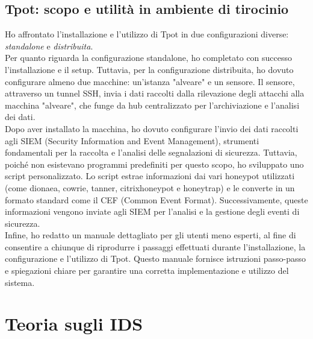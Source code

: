 \documentclass[12pt,a4paper,oneside,onecolumn,openright]{book}
\begin{document}
	\subsection{Tpot: scopo e utilità in ambiente di tirocinio}
	Ho affrontato l'installazione e l'utilizzo di Tpot in due configurazioni diverse: \textit{standalone} e \textit{distribuita}.\\
	Per quanto riguarda la configurazione standalone, ho completato con successo l'installazione e il setup. Tuttavia, per la configurazione distribuita, ho dovuto configurare almeno due macchine: un'istanza "alveare" e un sensore. Il sensore, attraverso un tunnel SSH, invia i dati raccolti dalla rilevazione degli attacchi alla macchina "alveare", che funge da hub centralizzato per l'archiviazione e l'analisi dei dati.\\
	Dopo aver installato la macchina, ho dovuto configurare l'invio dei dati raccolti agli SIEM (Security Information and Event Management), strumenti fondamentali per la raccolta e l'analisi delle segnalazioni di sicurezza. Tuttavia, poiché non esistevano programmi predefiniti per questo scopo, ho sviluppato uno script personalizzato. Lo script estrae informazioni dai vari honeypot utilizzati (come dionaea, cowrie, tanner, citrixhoneypot e honeytrap) e le converte in un formato standard come il CEF (Common Event Format). Successivamente, queste informazioni vengono inviate agli SIEM per l'analisi e la gestione degli eventi di sicurezza.\\
	Infine, ho redatto un manuale dettagliato per gli utenti meno esperti, al fine di consentire a chiunque di riprodurre i passaggi effettuati durante l'installazione, la configurazione e l'utilizzo di Tpot. Questo manuale fornisce istruzioni passo-passo e spiegazioni chiare per garantire una corretta implementazione e utilizzo del sistema.\\
	\newpage
	
	\section{Teoria sugli IDS}
\end{document}
